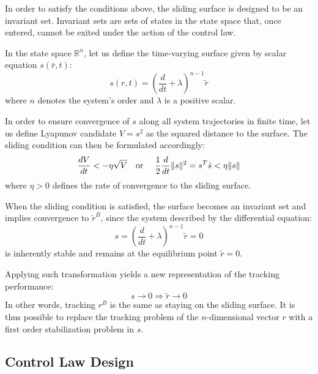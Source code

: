     In order to satisfy the conditions above, the sliding surface is designed to be an invariant set.
    Invariant sets are sets of states in the state space that, once entered, cannot be exited under 
    the action of the control law.

    In the state space $\mathbb{R}^n$, let us define the time-varying surface
    given by scalar equation $s(\bar{r}, t)$:
    \begin{equation}
        s({r}, t) = (\frac{d}{dt} + \lambda)^{n-1}\tilde{{r}}
    \end{equation}
    where $n$ denotes the system's order and $\lambda$ is a positive scalar.

    In order to ensure convergence of $s$ along all system trajectories in finite time, 
    let us define Lyapunov candidate $V = s^2$ as the squared distance to the surface.
    The sliding condition can then be formulated accordingly:
    \begin{equation}
    \frac{dV}{dt} < -\eta \sqrt{V} \text{\quad or \quad}
    \frac{1}{2}\frac{d}{dt}\|s\|^2 = s^T\dot{s} < \eta \|s\|
    \end{equation}
    where $\eta>0$ defines the rate of convergence to the sliding surface.

    When the sliding condition is satisfied, the surface becomes an invariant set
    and implies convergence to $\tilde{r}^B$, since the system described by 
    the differential equation:
    \begin{equation}
        s = (\frac{d}{dt} + \lambda)^{n-1}\tilde r = 0
    \end{equation}
    is inherently stable and remains at the equilibrium point $\tilde r = 0$.

    Applying such transformation yields a new representation of the tracking performance:
    \begin{equation}
        s \rightarrow 0 \Rightarrow \tilde{r} \rightarrow 0
    \end{equation}
    In other words, tracking $r^B$ is the same as staying on the sliding surface. 
    It is thus possible to replace the tracking problem of the $n$-dimensional vector 
    $r$ with a first order stabilization problem in $s$.

\subsection{Control Law Design}

